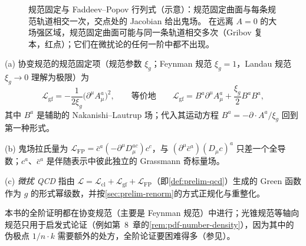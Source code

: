 \begin{figure}[htbp]
\caption{规范固定与 Faddeev--Popov 行列式（示意）：规范固定曲面与每条规范轨道相交一次，交点处的 Jacobian 给出鬼场。
在远离 $A=0$ 的大场强区域，规范固定曲面可能与同一条轨道相交多次（Gribov 复本，红点）；它们在微扰论的任何一阶中都不出现。}
\label{fig:qcd-gauge-orbit}
\end{figure}

\begin{definition}\label{def:qcd-fp}
(a) 协变规范的规范固定项（规范参数 $\xi_g$；Feynman 规范 $\xi_g=1$，Landau 规范 $\xi_g\to0$ 理解为极限）为 %
\begin{equation}\label{eq:qcd-gf}
\mathcal L_{\mathrm{gf}}=-\frac1{2\xi_g}\big(\partial^\mu A^a_\mu\big)^2,\qquad\text{等价地}\qquad \mathcal L_{\mathrm{gf}}=B^a\partial^\mu A^a_\mu+\frac{\xi_g}2B^aB^a ,
\end{equation}
其中 $B^a$ 是辅助的 Nakanishi--Lautrup 场；代入其运动方程 $B^a=-\partial\cdot A^a/\xi_g$ 回到第一种形式。

(b) 鬼场拉氏量为 $\mathcal L_{\mathrm{FP}}=\bar c^a(-\partial^\mu D^{ac}_\mu)c^c$，与 $(\partial^\mu\bar c^a)(D_\mu c)^a$ 只差一个全导数；$c^a$、$\bar c^a$ 是伴随表示中彼此独立的 Grassmann 奇标量场。

(c) \emph{微扰 QCD} 指由 $\mathcal L=\mathcal L_{\mathrm{cl}}+\mathcal L_{\mathrm{gf}}+\mathcal L_{\mathrm{FP}}$（即\cref{def:prelim-qcd}）生成的 Green 函数作为 $g$ 的形式幂级数，并按\cref{sec:prelim-renorm}的方式正规化与重整化。
\end{definition}

本书的全阶证明都在协变规范（主要是 Feynman 规范）中进行；光锥规范等轴向规范只用于启发式论证（例如第~8~章的\cref{rem:pdf-number-density}），因为其中的伪极点 $1/n\cdot k$ 需要额外的处方，全阶论证要困难得多（参见\cite{Collins2011}）。


